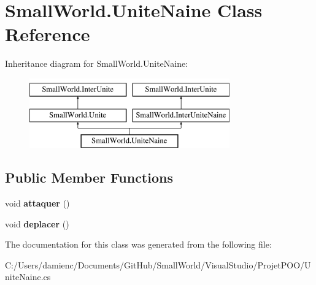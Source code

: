 \hypertarget{class_small_world_1_1_unite_naine}{\section{Small\-World.\-Unite\-Naine Class Reference}
\label{class_small_world_1_1_unite_naine}
}
Inheritance diagram for Small\-World.\-Unite\-Naine\-:\begin{figure}[H]
\begin{center}
\leavevmode
\includegraphics[height=3.000000cm]{class_small_world_1_1_unite_naine}
\end{center}
\end{figure}
\subsection*{Public Member Functions}
\begin{DoxyCompactItemize}
\item 
\hypertarget{class_small_world_1_1_unite_naine_acd80dd014d63ccccaa2743dfad1044d7}{void {\bfseries attaquer} ()}\label{class_small_world_1_1_unite_naine_acd80dd014d63ccccaa2743dfad1044d7}

\item 
\hypertarget{class_small_world_1_1_unite_naine_a2976f6b6d2bee701106717a69f6ff055}{void {\bfseries deplacer} ()}\label{class_small_world_1_1_unite_naine_a2976f6b6d2bee701106717a69f6ff055}

\end{DoxyCompactItemize}


The documentation for this class was generated from the following file\-:\begin{DoxyCompactItemize}
\item 
C\-:/\-Users/damienc/\-Documents/\-Git\-Hub/\-Small\-World/\-Visual\-Studio/\-Projet\-P\-O\-O/Unite\-Naine.\-cs\end{DoxyCompactItemize}
